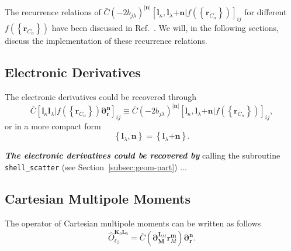 \documentclass[a4paper,11pt,twoside,openright]{book}
\newcommand{\fixme}[1]{\textbf{\textit{\color{red} #1}}}
\begin{document}
The recurrence relations of $\bar{C}(-2b_{j\lambda})^{|\boldsymbol{n}|}%
\left[\boldsymbol{l}_{\kappa},\boldsymbol{l}_{\lambda}\mathrm{+}\boldsymbol{n}%
\Big|f\left(\left\{\boldsymbol{r}_{C_{\alpha}}\right\}\right)\right]_{ij}$ for different $f\left(\left\{\boldsymbol{r}_{C_{\alpha}}\right\}\right)$
have been discussed in Ref.~\cite{Gao:IJQC:2010,bgkrth-a,bgkr}. We will, in the following sections, discuss
the implementation of these recurrence relations.

\subsection{Electronic Derivatives}
\label{subsec:elec-deriv}

The electronic derivatives could be recovered through
\begin{equation}
  \bar{C}\left[\boldsymbol{l}_{\kappa}\boldsymbol{l}_{\lambda}\Big|%
    f\left(\left\{\boldsymbol{r}_{C_{\alpha}}\right\}\right)%
    \boldsymbol{\partial}_{\boldsymbol{r}}^{\boldsymbol{n}}\right]_{ij}
  \equiv\bar{C}(-2b_{j\lambda})^{|\boldsymbol{n}|}%
    \left[\boldsymbol{l}_{\kappa},\boldsymbol{l}_{\lambda}\mathrm{+}\boldsymbol{n}%
      \Big|f\left(\left\{\boldsymbol{r}_{C_{\alpha}}\right\}\right)\right]_{ij},
\end{equation}
or in a more compact form
\begin{equation}
  \left\{\boldsymbol{l}_{\lambda},\boldsymbol{n}\right\}
    =\left\{\boldsymbol{l}_{\lambda}\mathrm{+}\boldsymbol{n}\right\}.
\end{equation}

\fixme{The electronic derivatives could be recovered by} calling the subroutine \verb|shell_scatter|
(see Section~\ref{subsec:geom-part}) ...

\subsection{Cartesian Multipole Moments}
\label{subsec:carmom}

The operator of Cartesian multipole moments can be written as follows
\begin{equation}
  \hat{O}_{\ell_{\beta}}^{\boldsymbol{K}_{0}\boldsymbol{L}_{0}}%
    =\bar{C}\left(\boldsymbol{\partial}_{\boldsymbol{M}}^{\boldsymbol{L}_{M}}\boldsymbol{r}_{M}^{\boldsymbol{m}}\right)%
      \boldsymbol{\partial}_{\boldsymbol{r}}^{\boldsymbol{n}}.
\end{equation}
\end{document}
